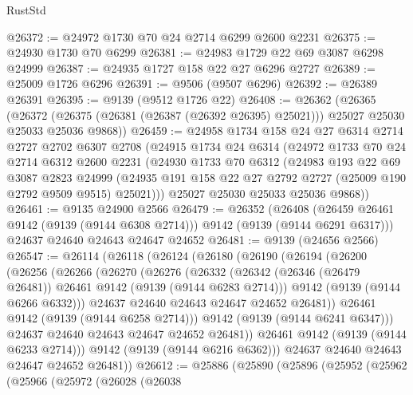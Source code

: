 \begin{lexlean}{RustStd}
\begin{coremodule}
@26372 := @24972 @1730 @70 @24 @2714 @6299 @2600 @2231
@26375 := @24930 @1730 @70 @6299
@26381 := @24983 @1729 @22 @69 @3087 @6298 @24999
@26387 := @24935 @1727 @158 @22 @27 @6296 @2727
@26389 := @25009 @1726 @6296
@26391 := @9506 (@9507 @6296)
@26392 := @26389 @26391
@26395 := @9139 (@9512 @1726 @22)
@26408 := @26362
    (@26365
      (@26372 (@26375 (@26381 (@26387 (@26392 @26395) @25021))) @25027 @25030 @25033 @25036 @9868))
@26459 := @24958
    @1734
    @158
    @24
    @27
    @6314
    @2714
    @2727
    @2702
    @6307
    @2708
    (@24915
      @1734
      @24
      @6314
      (@24972
        @1733
        @70
        @24
        @2714
        @6312
        @2600
        @2231
        (@24930
          @1733
          @70
          @6312
          (@24983
            @193
            @22
            @69
            @3087
            @2823
            @24999
            (@24935 @191 @158 @22 @27 @2792 @2727 (@25009 @190 @2792 @9509 @9515) @25021)))
        @25027
        @25030
        @25033
        @25036
        @9868))
@26461 := @9135 @24900 @2566
@26479 := @26352
    (@26408 (@26459 @26461 @9142 (@9139 (@9144 @6308 @2714))) @9142 (@9139 (@9144 @6291 @6317)))
    @24637
    @24640
    @24643
    @24647
    @24652
@26481 := @9139 (@24656 @2566)
@26547 := @26114
    (@26118
      (@26124
        (@26180
          (@26190
            (@26194
              (@26200
                (@26256
                  (@26266
                    (@26270
                      (@26276
                        (@26332
                          (@26342 (@26346 (@26479 @26481)) @26461 @9142 (@9139 (@9144 @6283 @2714)))
                          @9142
                          (@9139 (@9144 @6266 @6332)))
                        @24637
                        @24640
                        @24643
                        @24647
                        @24652
                        @26481))
                    @26461
                    @9142
                    (@9139 (@9144 @6258 @2714)))
                  @9142
                  (@9139 (@9144 @6241 @6347)))
                @24637
                @24640
                @24643
                @24647
                @24652
                @26481))
            @26461
            @9142
            (@9139 (@9144 @6233 @2714)))
          @9142
          (@9139 (@9144 @6216 @6362)))
        @24637
        @24640
        @24643
        @24647
        @24652
        @26481))
@26612 := @25886
    (@25890
      (@25896
        (@25952
          (@25962
            (@25966
              (@25972
                (@26028
                  (@26038

\end{coremodule}
\end{lexlean}
